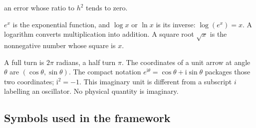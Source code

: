 \documentclass[11pt]{article}
\begin{document}
\begin{description}[leftmargin=*,style=nextline]
an error whose ratio to $h^2$ tends to zero.
\item[Exponentials and logarithms.] $e^x$ is the exponential function, and
$\log x$ or $\ln x$ is its inverse: $\log(e^x)=x$. A logarithm converts
multiplication into addition. A square root $\sqrt{x}$ is the nonnegative
number whose square is $x$.
\item[Angles and complex numbers.] A full turn is $2\pi$ radians, a half turn
$\pi$. The coordinates of a unit arrow at angle $\theta$ are
$(\cos\theta,\sin\theta)$. The compact notation
$e^{\mathrm{i}\theta}=\cos\theta+\mathrm{i}\sin\theta$ packages those two
coordinates; $\mathrm{i}^2=-1$. This imaginary unit is different from a
subscript $i$ labelling an oscillator. No physical quantity is imaginary.
\end{description}

\subsection{Symbols used in the framework}
\end{document}
